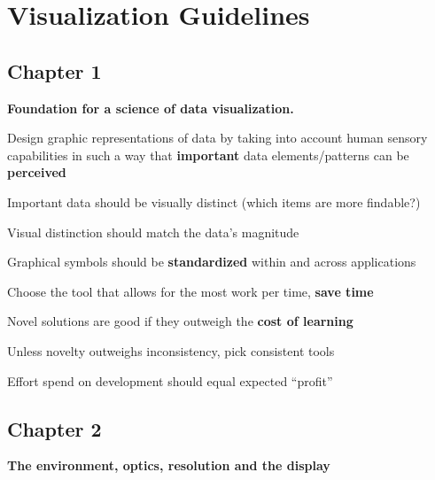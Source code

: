 \newcommand{\e}[1]{\textbf{#1}}

\section{Visualization Guidelines}


\subsection{Chapter 1}

\e{Foundation for a science of data visualization.}

\begin{compactenum}

    \item Design graphic representations of data by taking into account human
        sensory capabilities in such a way that \e{important} data
        elements/patterns can be \e{perceived}

    \item Important data should be visually distinct (which items are more
        findable?)

    \item Visual distinction should match the data's magnitude

    \item Graphical symbols should be \e{standardized} within and across
        applications

    \item Choose the tool that allows for the most work per time,
        \e{save time}

    \item Novel solutions are good if they outweigh the \e{cost of learning}

    \item Unless novelty outweighs inconsistency, pick consistent tools

    \item Effort spend on development should equal expected ``profit''

\end{compactenum}

\subsection{Chapter 2}
\e{The environment, optics, resolution and the display}

